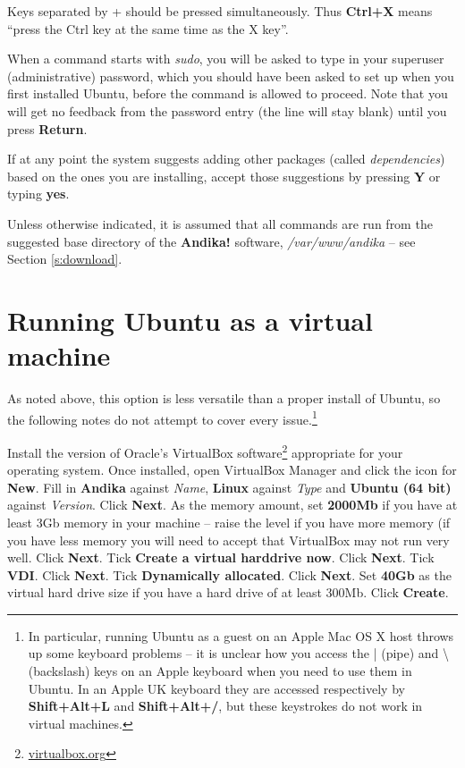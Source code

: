 Keys separated by + should be pressed simultaneously.  Thus \textbf{Ctrl+X} means ``press the Ctrl key at the same time as the X key''.

When a command starts with \textit{sudo}, you will be asked to type in your superuser (administrative) password, which you should have been asked to set up when you first installed Ubuntu, before the command is allowed to proceed.  Note that you will get no feedback from the password entry (the line will stay blank) until you press \textbf{Return}.

If at any point the system suggests adding other packages (called \textit{dependencies}) based on the ones you are installing, accept those suggestions by pressing \textbf{Y} or typing \textbf{yes}.

Unless otherwise indicated, it is assumed that all commands are run from the suggested base directory of the \textbf{Andika!} software, \textit{/var/www/andika} -- see Section \ref{s:download}.


\section{Running Ubuntu as a virtual machine}
\label{s:ubuntuvm}

As noted above, this option is less versatile than a proper install of Ubuntu, so the following notes do not attempt to cover every issue.\footnote{In particular, running Ubuntu as a guest on an Apple Mac OS X host throws up some keyboard problems -- it is unclear how you access the | (pipe) and \textbackslash (backslash) keys on an Apple keyboard when you need to use them in Ubuntu.  In an Apple UK keyboard they are accessed respectively by \textbf{Shift+Alt+L} and \textbf{Shift+Alt+/}, but these keystrokes do not work in virtual machines.}

Install the version of Oracle's VirtualBox software\footnote{\url{virtualbox.org}} appropriate for your operating system.  Once installed, open VirtualBox Manager and click the icon for \textbf{New}.  Fill in \textbf{Andika} against \textit{Name}, \textbf{Linux} against \textit{Type} and \textbf{Ubuntu (64 bit)} against \textit{Version}. Click \textbf{Next}.  As the memory amount, set \textbf{2000Mb} if you have at least 3Gb memory in your machine -- raise the level if you have more memory (if you have less memory you will need to accept that VirtualBox may not run very well.  Click \textbf{Next}.  Tick \textbf{Create a virtual harddrive now}.  Click \textbf{Next}.  Tick \textbf{VDI}.  Click \textbf{Next}.  Tick \textbf{Dynamically allocated}.  Click \textbf{Next}.  Set \textbf{40Gb} as the virtual hard drive size if you have a hard drive of at least 300Mb.  Click \textbf{Create}.

